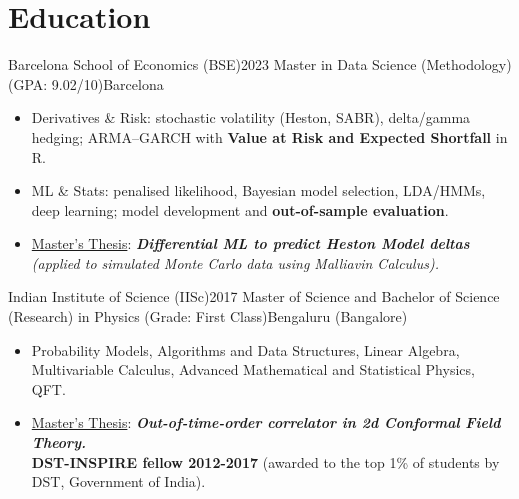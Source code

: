 \section*{Education}
\vspace{-2pt}
  \resumeSubHeadingListStart
    \resumeSubheading
  {Barcelona School of Economics (BSE)}{2023}
  {Master in Data Science (Methodology) (GPA: 9.02/10)}{Barcelona}
\begin{itemize}[leftmargin=*, noitemsep=2, partopsep=0pt]
\vspace{3pt}
    \item Derivatives \& Risk: stochastic volatility (Heston, SABR), delta/gamma hedging; ARMA–GARCH with \textbf{Value at Risk and Expected Shortfall} in R.
\vspace{1pt}
    \item ML \& Stats: penalised likelihood, Bayesian model selection, LDA/HMMs, deep learning; model development and \textbf{out-of-sample evaluation}.
\vspace{1pt}
    \item \underline{Master's Thesis}: \textit{\textbf{Differential ML to predict Heston Model deltas} (applied to simulated Monte Carlo data using Malliavin Calculus).} 

\end{itemize}    


    \resumeSubheading
      {Indian Institute of Science (IISc)}{2017}
      {Master of Science and Bachelor of Science (Research) in Physics  (Grade: First Class)}{Bengaluru (Bangalore)}
\begin{itemize}[leftmargin=*, noitemsep=2, partopsep=0pt]
\vspace{3pt}
    \item Probability Models, Algorithms and Data Structures, Linear Algebra, Multivariable Calculus, Advanced Mathematical and Statistical Physics, QFT.
\vspace{1pt}
    \item \underline{Master's Thesis}: \textit{\textbf{Out-of-time-order correlator in 2d Conformal Field Theory.}}\\
    \textbf{DST-INSPIRE fellow 2012-2017} (awarded to the top 1\% of students by DST, Government of India). 
\end{itemize}    


